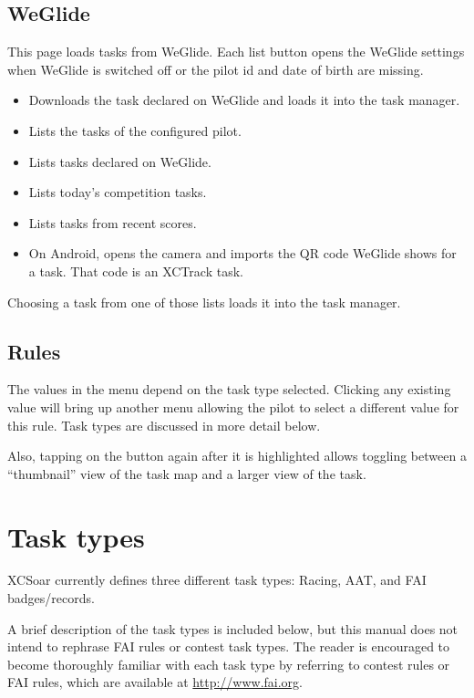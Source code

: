 \subsection*{WeGlide}
This page loads tasks from WeGlide.  Each list button opens the WeGlide
 settings when WeGlide is switched off or
the pilot id and date of birth are missing.

\begin{itemize}
\item [\bmenuw{Download Declaration}] Downloads the task declared on
  WeGlide and loads it into the task manager.
\item [\bmenuw{My Tasks}] Lists the tasks of the configured pilot.
\item [\bmenuw{Declared Tasks}] Lists tasks declared on WeGlide.
\item [\bmenuw{Competitions Today}] Lists today's competition tasks.
\item [\bmenuw{Recent Scores}] Lists tasks from recent scores.
\item [\bmenuw{Scan QR Code}] On Android, opens the camera and imports
  the QR code WeGlide shows for a task.  That code is an XCTrack task.
\end{itemize}

Choosing a task from one of those lists loads it into the task manager.

\subsection*{Rules}
The values in the menu depend on the task type selected. Clicking any existing
 value will bring up another menu allowing the pilot to select a
different value for this rule.  Task types are discussed in more detail below.

Also, tapping on the  button again after it is highlighted allows
toggling between a ``thumbnail'' view of the task map and a larger view of the task.

\section{Task types}
XCSoar currently defines three different task types: Racing, AAT, and FAI badges/records.

A brief description of the task types is included below, but this manual does
not intend to rephrase FAI rules or contest task types. The reader is encouraged
to become thoroughly familiar with each task type by referring to contest rules
or FAI rules, which are available at \url{http://www.fai.org}.


